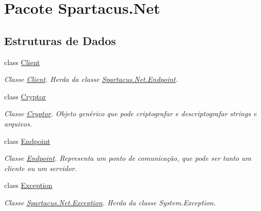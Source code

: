 \hypertarget{namespaceSpartacus_1_1Net}{\section{Pacote Spartacus.\+Net}
\label{namespaceSpartacus_1_1Net}
}
\subsection*{Estruturas de Dados}
\begin{DoxyCompactItemize}
\item 
class \hyperlink{classSpartacus_1_1Net_1_1Client}{Client}
\begin{DoxyCompactList}\small\item\em Classe \hyperlink{classSpartacus_1_1Net_1_1Client}{Client}. Herda da classe \hyperlink{classSpartacus_1_1Net_1_1Endpoint}{Spartacus.\+Net.\+Endpoint}. \end{DoxyCompactList}\item 
class \hyperlink{classSpartacus_1_1Net_1_1Cryptor}{Cryptor}
\begin{DoxyCompactList}\small\item\em Classe \hyperlink{classSpartacus_1_1Net_1_1Cryptor}{Cryptor}. Objeto genérico que pode criptografar e descriptografar strings e arquivos. \end{DoxyCompactList}\item 
class \hyperlink{classSpartacus_1_1Net_1_1Endpoint}{Endpoint}
\begin{DoxyCompactList}\small\item\em Classe \hyperlink{classSpartacus_1_1Net_1_1Endpoint}{Endpoint}. Representa um ponto de comunicação, que pode ser tanto um cliente ou um servidor. \end{DoxyCompactList}\item 
class \hyperlink{classSpartacus_1_1Net_1_1Exception}{Exception}
\begin{DoxyCompactList}\small\item\em Classe \hyperlink{classSpartacus_1_1Net_1_1Exception}{Spartacus.\+Net.\+Exception}. Herda da classe System.\+Exception. \end{DoxyCompactList}\end{DoxyCompactItemize}
